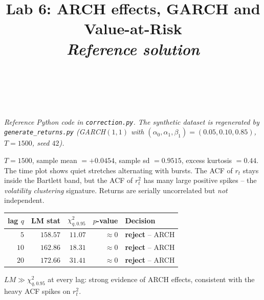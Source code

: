 \documentclass[a4paper,11pt]{article}
\title{Lab 6: ARCH effects, GARCH and Value-at-Risk\\
\large \emph{Reference solution}}
\author{\auteurNom\\\auteurEmail\\\auteurInstitution}
\date{\anneeUniversitaire}
\begin{document}
\maketitle

\noindent\emph{Reference Python code in \texttt{correction.py}.
The synthetic dataset is regenerated by \texttt{generate\_returns.py}
(GARCH$(1, 1)$ with $(\alpha_0, \alpha_1, \beta_1) = (0.05, 0.10,
0.85)$, $T = 1500$, seed $42$).}

\setcounter{excounter}{0}

\begin{exercise}\end{exercise}

\begin{solution}
$T = 1500$, sample mean $= +0.0454$, sample sd $= 0.9515$, excess
kurtosis $= 0.44$. The time plot shows quiet stretches alternating
with bursts. The ACF of $r_t$ stays inside the Bartlett band, but
the ACF of $r_t^2$ has many large positive spikes -- the
\emph{volatility clustering} signature. Returns are
serially uncorrelated but \emph{not} independent.
\end{solution}

\begin{exercise}\end{exercise}

\begin{solution}
\begin{center}
\begin{tabular}{rrrrl}
\toprule
lag $q$ & LM stat & $\chi^2_{q, 0.95}$ & $p$-value & Decision \\
\midrule
$5$    & $158.57$ & $11.07$ & $\approx 0$ & \textbf{reject} -- ARCH \\
$10$   & $162.86$ & $18.31$ & $\approx 0$ & \textbf{reject} -- ARCH \\
$20$   & $172.66$ & $31.41$ & $\approx 0$ & \textbf{reject} -- ARCH \\
\bottomrule
\end{tabular}
\end{center}
$LM \gg \chi^2_{q, 0.95}$ at every lag: strong evidence of ARCH
effects, consistent with the heavy ACF spikes on $r_t^2$.
\end{solution}

\begin{exercise}\end{exercise}
\end{document}
